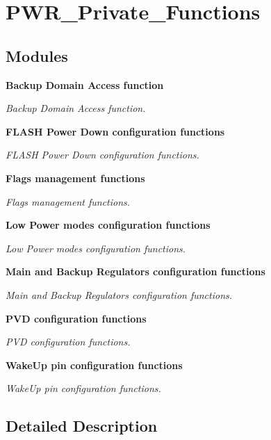 \section{P\+W\+R\+\_\+\+Private\+\_\+\+Functions}
\label{group__PWR__Private__Functions}
\subsection*{Modules}
\begin{DoxyCompactItemize}
\item 
\textbf{ Backup Domain Access function}
\begin{DoxyCompactList}\small\item\em Backup Domain Access function. \end{DoxyCompactList}\item 
\textbf{ F\+L\+A\+S\+H Power Down configuration functions}
\begin{DoxyCompactList}\small\item\em F\+L\+A\+SH Power Down configuration functions. \end{DoxyCompactList}\item 
\textbf{ Flags management functions}
\begin{DoxyCompactList}\small\item\em Flags management functions. \end{DoxyCompactList}\item 
\textbf{ Low Power modes configuration functions}
\begin{DoxyCompactList}\small\item\em Low Power modes configuration functions. \end{DoxyCompactList}\item 
\textbf{ Main and Backup Regulators configuration functions}
\begin{DoxyCompactList}\small\item\em Main and Backup Regulators configuration functions. \end{DoxyCompactList}\item 
\textbf{ P\+V\+D configuration functions}
\begin{DoxyCompactList}\small\item\em P\+VD configuration functions. \end{DoxyCompactList}\item 
\textbf{ Wake\+Up pin configuration functions}
\begin{DoxyCompactList}\small\item\em Wake\+Up pin configuration functions. \end{DoxyCompactList}\end{DoxyCompactItemize}


\subsection{Detailed Description}
